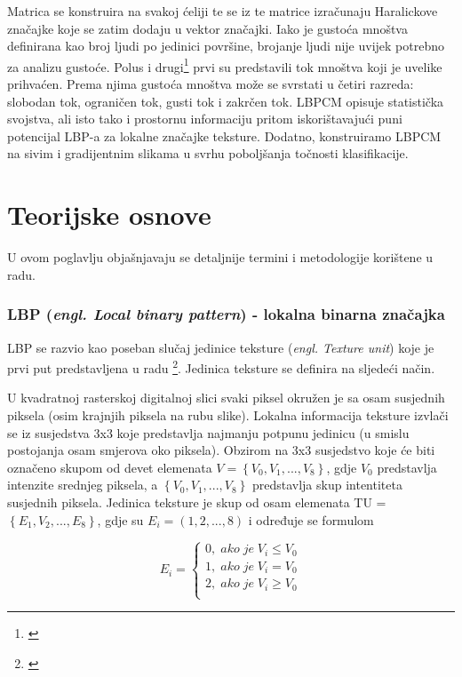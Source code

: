 \documentclass[times, utf8, zavrsni]{fer}
\begin{document}
Matrica se konstruira na svakoj ćeliji te se iz te matrice izračunaju 
Haralickove značajke koje se zatim dodaju u vektor značajki. Iako je 
gustoća mnoštva definirana kao broj ljudi po jedinici površine, 
brojanje ljudi nije uvijek potrebno za analizu gustoće. Polus i 
drugi\footnote{\cite{polus}} prvi su predstavili tok mnoštva koji je uvelike prihvaćen. 
Prema njima gustoća mnoštva može se svrstati u četiri razreda: 
slobodan tok, ograničen tok, gusti tok i zakrčen tok. 
LBPCM opisuje statistička svojstva, ali isto tako i prostornu 
informaciju pritom iskorištavajući puni potencijal LBP-a za 
lokalne značajke teksture. Dodatno, konstruiramo LBPCM na sivim i 
gradijentnim slikama u svrhu poboljšanja točnosti klasifikacije.


\chapter{Teorijske osnove}
U ovom poglavlju objašnjavaju se detaljnije termini i metodologije korištene u radu.

\subsection{LBP (\textit{engl. Local binary pattern}) - lokalna binarna značajka}

LBP se razvio kao poseban slučaj jedinice teksture (\textit{engl. Texture unit})
koje je prvi put predstavljena u radu \footnote{\cite{dong}}.
Jedinica teksture se definira na sljedeći način. 

\bigbreak

U kvadratnoj rasterskoj digitalnoj slici svaki piksel okružen je sa 
osam susjednih piksela (osim krajnjih piksela na rubu slike). 
Lokalna informacija teksture izvlači se iz susjedstva 3x3 koje 
predstavlja najmanju potpunu jedinicu (u smislu postojanja osam 
smjerova oko piksela). Obzirom na 3x3 susjedstvo koje će biti 
označeno skupom od devet elemenata \(V = \left\{V_0, V_1,..., V_8\right\}\),
gdje \(V_0\) predstavlja intenzite srednjeg piksela, a 
\(\left\{V_0, V_1,..., V_8\right\}\) predstavlja skup intentiteta susjednih piksela.
Jedinica teksture je skup od osam elemenata TU = \(\left\{E_1, V_2,..., E_8\right\}\),
gdje su \(E_i = (1,2,...,8)\) i određuje se formulom

\[
E_i = \left\{
\begin{matrix}
0, \; ako \; je \; V_i \le V_0 \\
1, \; ako \; je \; V_i = V_0 \\
2, \; ako \; je \; V_i \ge V_0 \\
\end{matrix}
\right.
\]
\end{document}
